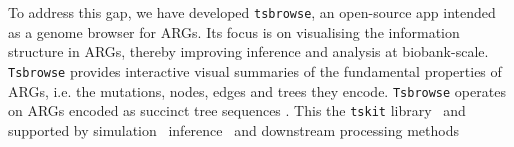 \documentclass[unnumsec,webpdf,contemporary,large,namedate]{oup-authoring-template}%
\begin{document}

To address this gap, we have developed \texttt{tsbrowse}, an open-source app
intended as a genome browser for ARGs. Its  focus is on visualising the
information structure in ARGs, thereby improving  inference and analysis at
biobank-scale. \texttt{Tsbrowse} provides interactive visual summaries of  the
fundamental properties of ARGs, i.e. the mutations, nodes, edges and trees they
encode. \texttt{Tsbrowse} operates on ARGs encoded as succinct tree sequences
\citep{wong2024general}. 
This the \texttt{tskit} library~\citep{ralph2020efficiently}
and supported by 
simulation~\citep{kelleher2016efficient,kelleher2018efficient,
haller2019tree,baumdicker2022efficient,
adrion2020community,lauterbur2023expanding,tsambos2023link,tagami2024tstrait}
inference~\citep{kelleher2019inferring,speidel2019method,wohns2022unified,
mahmoudi2022bayesian,zhan2023towards,zhang2023biobank,deng2025general}
and downstream processing methods~\citep{link2023tree,nowbandegani2023extremely}


\end{document}
